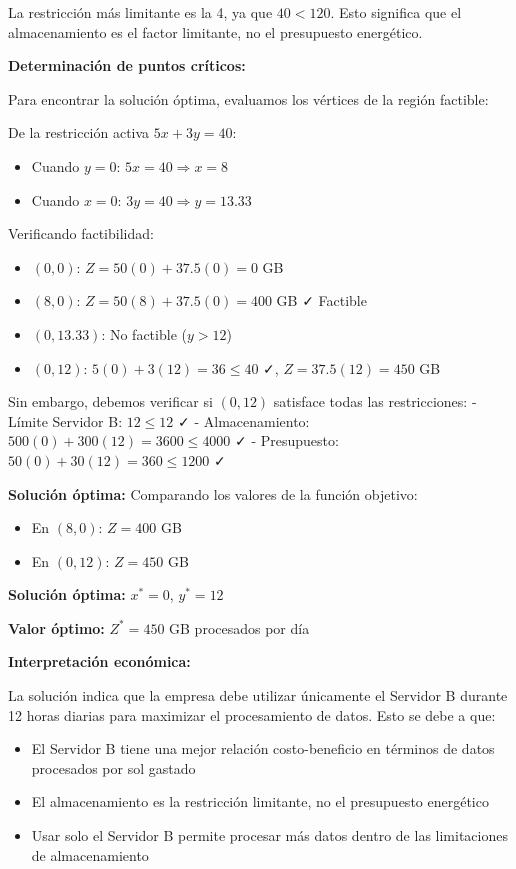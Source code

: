 \documentclass[12pt,a4paper]{article}
\begin{document}
La restricción más limitante es la 4, ya que $40 < 120$. Esto significa que el almacenamiento es el factor limitante, no el presupuesto energético.

\textbf{ Determinación de puntos críticos:}

Para encontrar la solución óptima, evaluamos los vértices de la región factible:

De la restricción activa $5x + 3y = 40$:
\begin{itemize}
\item Cuando $y = 0$: $5x = 40 \Rightarrow x = 8$
\item Cuando $x = 0$: $3y = 40 \Rightarrow y = 13.33$
\end{itemize}

Verificando factibilidad:
\begin{itemize}
\item $(0, 0)$: $Z = 50(0) + 37.5(0) = 0$ GB
\item $(8, 0)$: $Z = 50(8) + 37.5(0) = 400$ GB ✓ Factible
\item $(0, 13.33)$: No factible ($y > 12$)
\item $(0, 12)$: $5(0) + 3(12) = 36 \leq 40$ ✓, $Z = 37.5(12) = 450$ GB
\end{itemize}

Sin embargo, debemos verificar si $(0, 12)$ satisface todas las restricciones:
- Límite Servidor B: $12 \leq 12$ ✓
- Almacenamiento: $500(0) + 300(12) = 3600 \leq 4000$ ✓
- Presupuesto: $50(0) + 30(12) = 360 \leq 1200$ ✓

\textbf{ Solución óptima:}
Comparando los valores de la función objetivo:
\begin{itemize}
\item En $(8, 0)$: $Z = 400$ GB
\item En $(0, 12)$: $Z = 450$ GB
\end{itemize}

\textbf{Solución óptima:} $x^* = 0$, $y^* = 12$

\textbf{Valor óptimo:} $Z^* = 450$ GB procesados por día

\textbf{Interpretación económica:}

La solución indica que la empresa debe utilizar únicamente el Servidor B durante 12 horas diarias para maximizar el procesamiento de datos. Esto se debe a que:

\begin{itemize}
\item El Servidor B tiene una mejor relación costo-beneficio en términos de datos procesados por sol gastado
\item El almacenamiento es la restricción limitante, no el presupuesto energético
\item Usar solo el Servidor B permite procesar más datos dentro de las limitaciones de almacenamiento
\end{itemize}
\end{document}
